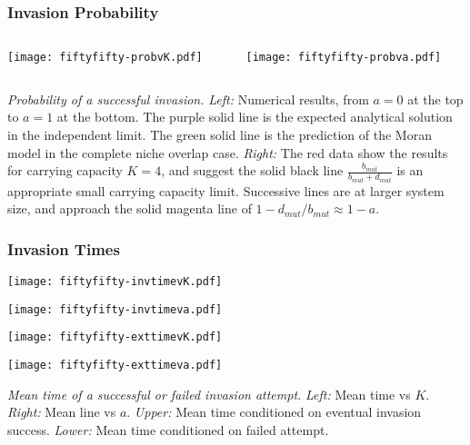 \documentclass{beamer}
\begin{document}
\begin{frame}
\frametitle{Invasion Probability}
\begin{columns}
\begin{column}{5.5cm}
	\begin{center}
		\texttt{[image: fiftyfifty-probvK.pdf]}
	\end{center}
\end{column}
\begin{column}{5.5cm}
	\begin{center}
		\texttt{[image: fiftyfifty-probva.pdf]}
	\end{center}
\end{column}
\end{columns}
\justifying
\footnotesize{
\emph{Probability of a successful invasion.}
\emph{Left:} Numerical results, from $a=0$ at the top to $a=1$ at the bottom. The purple solid line is the expected analytical solution in the independent limit. The green solid line is the prediction of the Moran model in the complete niche overlap case. 
\emph{Right:} The red data show the results for carrying capacity $K=4$, and suggest the solid black line $\frac{b_{mut}}{b_{mut}+d_{mut}}$ is an appropriate small carrying capacity limit. Successive lines are at larger system size, and approach the solid magenta line of $1-d_{mut}/b_{mut}\approx 1-a$.
}
\end{frame}


\begin{frame}
\frametitle{Invasion Times}
\centering
\begin{minipage}[b]{0.475\textwidth}
	\centering
	\texttt{[image: fiftyfifty-invtimevK.pdf]}
\end{minipage}
\hfill
\begin{minipage}[b]{0.475\textwidth}  
	\centering 
	\texttt{[image: fiftyfifty-invtimeva.pdf]}
\end{minipage}
\begin{minipage}[b]{0.475\textwidth}   
	\centering 
	\texttt{[image: fiftyfifty-exttimevK.pdf]}
\end{minipage}
\quad
\begin{minipage}[b]{0.475\textwidth}   
	\centering
	\texttt{[image: fiftyfifty-exttimeva.pdf]}
\end{minipage}
\justifying
\tiny{
\emph{Mean time of a successful or failed invasion attempt.}
\emph{Left:} Mean time vs $K$. 
\emph{Right:} Mean line vs $a$. 
\emph{Upper:} Mean time conditioned on eventual invasion success. 
\emph{Lower:} Mean time conditioned on failed attempt. 
}
\end{frame}
\end{document}
